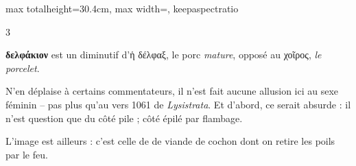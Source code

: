 \documentclass[11pt,twoside]{book}
\newcommand{\italique}[1]{\textit{#1}}
\begin{document}
\begin{adjustbox}{max totalheight=30.4cm, max width=\textwidth, keepaspectratio}
\begin{minipage}{\textwidth}
{\begin{multicols}{3}
\par\vspace{1.5pt}
 \textbf{δελφάκιον} est un diminutif d'ἡ δέλφαξ, le porc \italique{mature}, opposé au χοῖρος, \italique{le porcelet}.
\par\vspace{1.5pt}
\noindent N'en déplaise à certains commentateurs, il n'est fait aucune allusion ici au sexe féminin -- pas plus qu'au vers 1061 de \italique{Lysistrata}. Et d'abord, ce serait absurde : il n'est question que du côté pile ; côté épilé par flambage.
\par\vspace{1.5pt}
\noindent L'image est ailleurs : c'est celle de de viande de cochon dont on retire les poils par le feu.
\par\end{multicols}}
\end{minipage}\end{adjustbox}
\newpage
\end{document}
